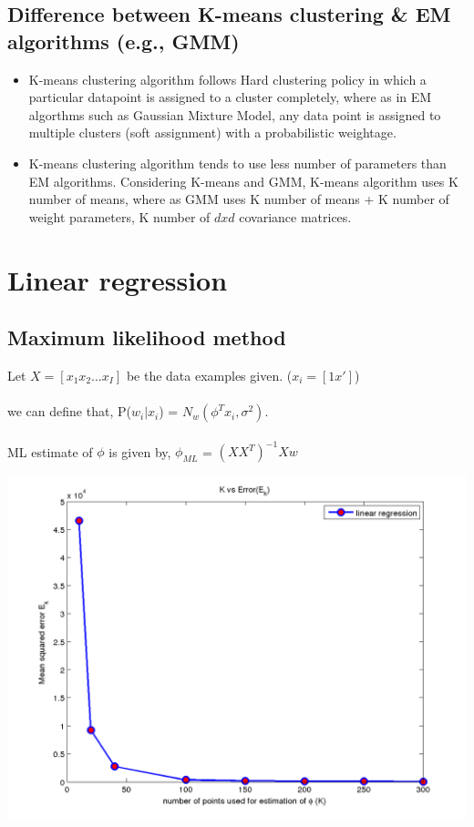 \documentclass[fleqn]{article}
\begin{document}
\subsection{Difference between K-means clustering \& EM algorithms (e.g., GMM)}

\begin{itemize}
	\item K-means clustering algorithm follows Hard clustering policy in which a particular datapoint is assigned to a cluster completely, where as 
	in EM algorthms such as Gaussian Mixture Model, any data point is assigned to multiple clusters (soft assignment) with a probabilistic weightage.
	\item K-means clustering algorithm tends to use less number of parameters than EM algorithms. Considering K-means and GMM, 
	K-means algorithm uses K number of means, where as GMM uses K number of means + K number of weight parameters, K number of $dxd$ covariance matrices.
\end{itemize}

\newpage
\section{Linear regression}
\subsection{Maximum likelihood method}
Let $X=[x_1 x_2 \ldots x_I]$ be the data examples given. ($x_i = [1 x']$)\\\\
we can define that, P($w_i|x_i$) = $N_w(\phi^Tx_i, \sigma^2)$. \\\\
ML estimate of $\phi$ is given by, $\phi_{ML}$ = $(XX^T)^{-1}Xw$

\includegraphics[scale=0.6]{./pics/task3/linear_regression_error_vs_k.png}
\end{document}

